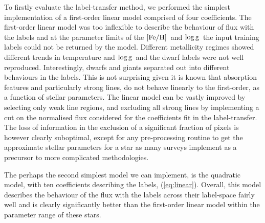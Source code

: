 \documentclass[12pt, preprint]{aastex}
\newcommand{\feh}{\mbox{$\rm [Fe/H]$}}
\newcommand{\logg}{\mbox{$\rm \log g$}}
\newcommand{\tc}{\textsl{The~Cannon}}
\begin{document}
To firstly evaluate the label-transfer method, we performed the simplest implementation of a first-order linear model comprised of four coefficients. The first-order linear model was too inflexible to describe the behaviour of flux with the labels and at the parameter limits of the \feh\ and \logg\ the input training labels could not be returned by the model. Different metallicity regimes showed different trends in temperature and \logg\ and the dwarf labels were not well reproduced. Interestingly, dwarfs and giants separated out into different behaviours in the labels. This is not surprising given it is known that absorption features and particularly strong lines, do not behave linearly to the first-order, as a function of stellar parameters. 
The linear model can be vastly improved by selecting only weak line regions, and excluding all strong lines by implementing a cut on the normalised flux considered for the coefficients fit in the label-transfer. The loss of information in the exclusion of a significant fraction of pixels is however clearly suboptimal, except for any pre-processing routine to get the approximate stellar parameters for a star as many surveys implement as a precursor to more complicated methodologies. 









The perhaps the second simplest model we can implement, is the quadratic model, with ten coefficients describing the labels, (\ref{eq:linear}).  Overall, this model describes the behaviour of the flux with the labels across their label-space fairly well and is clearly significantly better than the first-order linear model within the parameter range of these stars. 
\end{document}
